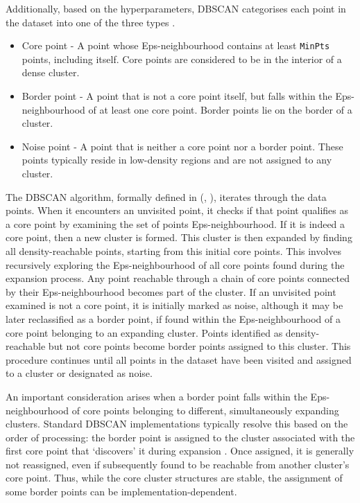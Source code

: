 \documentclass[10pt,oneside]{report}
\renewcommand{\citet}[1]{\citeauthor{#1}, \citeyear{#1}}
\begin{document}
Additionally, based on the hyperparameters, DBSCAN categorises each point in the dataset into one of the three types \cite{ester1996density}. 
\begin{itemize}
    \item Core point - A point whose Eps-neighbourhood contains at least \texttt{MinPts} points, including itself. Core points are considered to be in the interior of a dense cluster.
    \item Border point - A point that is not a core point itself, but falls within the Eps-neighbourhood of at least one core point. Border points lie on the border of a cluster.
    \item Noise point - A point that is neither a core point nor a border point. These points typically reside in low-density regions and are not assigned to any cluster.
\end{itemize}

The DBSCAN algorithm, formally defined in (\citet{ester1996density}), iterates through the data points. When it encounters an unvisited point, it checks if that point qualifies as a core point by examining the set of points Eps-neighbourhood. If it is indeed a core point, then a new cluster is formed. This cluster is then expanded by finding all density-reachable points, starting from this initial core points. This involves recursively exploring the Eps-neighbourhood of all core points found during the expansion process. Any point reachable through a chain of core points connected by their Eps-neighbourhood becomes part of the cluster. If an unvisited point examined is not a core point, it is initially marked as noise, although it may be later reclassified as a border point, if found within the Eps-neighbourhood of a core point belonging to an expanding cluster. Points identified as density-reachable but not core points become border points assigned to this cluster. This procedure continues until all points in the dataset have been visited and assigned to a cluster or designated as noise.

An important consideration arises when a border point falls within the Eps-neighbourhood of core points belonging to different, simultaneously expanding clusters. Standard DBSCAN implementations typically resolve this based on the order of processing: the border point is assigned to the cluster associated with the first core point that `discovers' it during expansion \cite{ester1996density}. Once assigned, it is generally not reassigned, even if subsequently found to be reachable from another cluster's core point. Thus, while the core cluster structures are stable, the assignment of some border points can be implementation-dependent.
\end{document}
